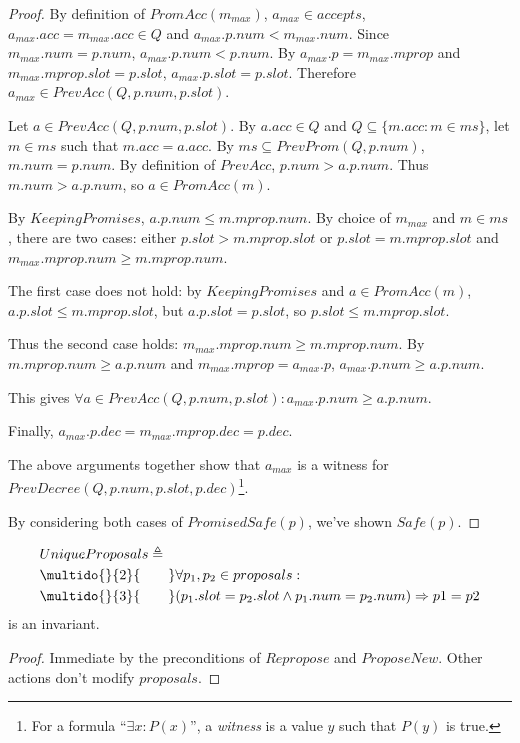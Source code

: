 \documentclass[12pt,a4paper,en]{pracamgr}
\newcommand{\ind}[1]{\multido{}{#1}{\qquad}}
\begin{document}
\begin{proof}
    By definition of $PromAcc(m_{max})$, $a_{max} \in accepts$, $a_{max}.acc = m_{max}.acc \in Q$ and $a_{max}.p.num < m_{max}.num$. Since $m_{max}.num = p.num$, $a_{max}.p.num < p.num$. By $a_{max}.p = m_{max}.mprop$ and $m_{max}.mprop.slot = p.slot$, $a_{max}.p.slot = p.slot$. Therefore $a_{max} \in PrevAcc(Q, p.num, p.slot)$.

    Let $a \in PrevAcc(Q, p.num, p.slot)$. By $a.acc \in Q$ and $Q \subseteq \{m.acc: m \in ms\}$, let $m \in ms$ such that $m.acc = a.acc$. By $ms \subseteq PrevProm(Q, p.num)$, $m.num = p.num$. By definition of $PrevAcc$, $p.num > a.p.num$. Thus $m.num > a.p.num$, so $a \in PromAcc(m)$.

    By $KeepingPromises$, $a.p.num \le m.mprop.num$. By choice of $m_{max}$ and $m \in ms$, there are two cases: either $p.slot > m.mprop.slot$ or $p.slot = m.mprop.slot$ and $m_{max}.mprop.num \ge m.mprop.num$.

    The first case does not hold: by $KeepingPromises$ and $a \in PromAcc(m)$, $a.p.slot \le m.mprop.slot$, but $a.p.slot = p.slot$, so $p.slot \le m.mprop.slot$.

    Thus the second case holds: $m_{max}.mprop.num \ge m.mprop.num$. By $m.mprop.num \ge a.p.num$ and $m_{max}.mprop = a_{max}.p$, $a_{max}.p.num \ge a.p.num$.

    This gives $\forall a \in PrevAcc(Q, p.num, p.slot): a_{max}.p.num \ge a.p.num$.

    Finally, $a_{max}.p.dec = m_{max}.mprop.dec = p.dec$.

    The above arguments together show that $a_{max}$ is a witness for\\$PrevDecree(Q, p.num, p.slot, p.dec)$\footnote{For a formula ``$\exists x: P(x)$'', a \textit{witness} is a value $y$ such that $P(y)$ is true.}.

    By considering both cases of $PromisedSafe(p)$, we've shown $Safe(p)$.
\end{proof}

\begin{lemma}
    \begin{align*}
        & UniqueProposals \triangleq\\
        & \ind{2} \forall p_1, p_2 \in proposals:\\
        & \ind{3} (p_1.slot = p_2.slot \land p_1.num = p_2.num) \Rightarrow p1 = p2
    \end{align*}
    is an invariant.
\end{lemma}
\begin{proof}
    Immediate by the preconditions of $Repropose$ and $ProposeNew$. Other actions don't modify $proposals$.
\end{proof}
\end{document}
